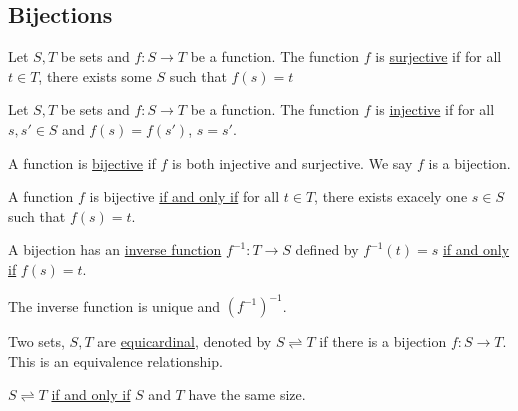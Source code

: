\documentclass[11pt]{article}
\newcommand{\equicard}{\rightleftharpoons}
\begin{document}
\begin{titlepage}
\subsection{Bijections}
\begin{definition}
    Let $S, T$ be sets and $f :S \to T$ be a function. The function $f$ is
	\underline{surjective} if for all $t \in T$, there exists some $S$ such that
	$f(s) = t$
\end{definition}
\begin{definition}
    Let $S, T$ be sets and $f :S \to T$ be a function. The function $f$ is
	\underline{injective} if for all $s, s' \in S$ and $f(s) = f(s')$, $s = s'$.
\end{definition}
\begin{definition}
	A function is \underline{bijective} if $f$ is both injective and surjective.
	We say $f$ is a bijection.
\end{definition}
\begin{prop}
	A function $f$ is bijective \underline{if and only if} for all $t \in T$,
	there exists exacely one $s \in S$ such that $f(s) = t$.
\end{prop}
\begin{definition}
	A bijection has an \underline{inverse function} $f^{-1} : T \to S$ defined
	by $f^{-1}(t) = s$ \underline{if and only if} $f(s) = t$.
\end{definition}
\begin{remark}
	The inverse function is unique and $(f^{-1})^{-1}$.
\end{remark}
\begin{definition}
	Two sets, $S, T$ are \underline{equicardinal}, denoted by $S \equicard T$ if
	there is a bijection $f:S \to T$. This is an equivalence relationship.
\end{definition}
\begin{prop}
	$S \equicard T$ \underline{if and only if} $S$ and $T$ have the same size.
\end{prop}


\end{titlepage}
\end{document}
